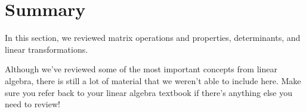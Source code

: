 \documentclass{ximera}
\begin{document}
\section{Summary}

In this section, we reviewed matrix operations and properties, determinants, and linear transformations.

Although we've reviewed some of the most important concepts from linear algebra, there is still a lot of material that we weren't able to include here. Make sure you refer back to your linear algebra textbook if there's anything else you need to review!
\end{document}

